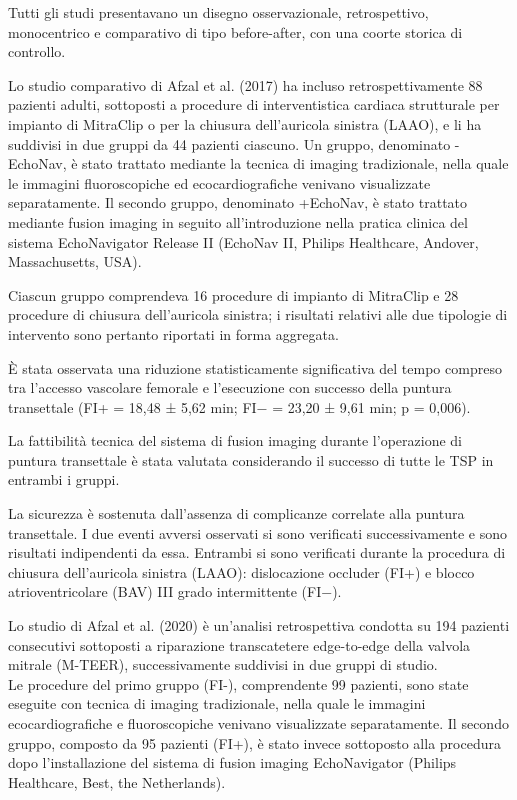 \documentclass[12pt,a4paper,twoside]{article}
\begin{document}
Tutti gli studi presentavano un disegno osservazionale, retrospettivo, monocentrico e comparativo di tipo before-after, con una coorte storica di controllo. \cite{ref24,ref25,ref26}

Lo studio comparativo di Afzal et al. (2017) ha incluso retrospettivamente 88 pazienti adulti, sottoposti a procedure di interventistica cardiaca strutturale per impianto di MitraClip o per la chiusura dell'auricola sinistra (LAAO), e li ha suddivisi in due gruppi da 44 pazienti ciascuno. Un gruppo, denominato -EchoNav, è stato trattato mediante la tecnica di imaging tradizionale, nella quale le immagini fluoroscopiche ed ecocardiografiche venivano visualizzate separatamente. Il secondo gruppo, denominato +EchoNav, è stato trattato mediante fusion imaging in seguito all'introduzione nella pratica clinica del sistema EchoNavigator Release II (EchoNav II, Philips Healthcare, Andover, Massachusetts, USA). \cite{ref24}

Ciascun gruppo comprendeva 16 procedure di impianto di MitraClip e 28 procedure di chiusura dell'auricola sinistra; i risultati relativi alle due tipologie di intervento sono pertanto riportati in forma aggregata. \cite{ref24}

È stata osservata una riduzione statisticamente significativa del tempo compreso tra l'accesso vascolare femorale e l'esecuzione con successo della puntura transettale (FI+ = 18,48 ± 5,62 min; FI− = 23,20 ± 9,61 min; p = 0,006). \cite{ref24}

La fattibilità tecnica del sistema di fusion imaging durante l'operazione di puntura transettale è stata valutata considerando il successo di tutte le TSP in entrambi i gruppi. \cite{ref24}

La sicurezza è sostenuta dall'assenza di complicanze correlate alla puntura transettale. I due eventi avversi osservati si sono verificati successivamente e sono risultati indipendenti da essa. Entrambi si sono verificati durante la procedura di chiusura dell'auricola sinistra (LAAO): dislocazione occluder (FI+) e blocco atrioventricolare (BAV) III grado intermittente (FI−). \cite{ref24}

Lo studio di Afzal et al. (2020) è un'analisi retrospettiva condotta su 194 pazienti consecutivi sottoposti a riparazione transcatetere edge-to-edge della valvola mitrale (M-TEER), successivamente suddivisi in due gruppi di studio.\\
Le procedure del primo gruppo (FI-), comprendente 99 pazienti, sono state eseguite con tecnica di imaging tradizionale, nella quale le immagini ecocardiografiche e fluoroscopiche venivano visualizzate separatamente. Il secondo gruppo, composto da 95 pazienti (FI+), è stato invece sottoposto alla procedura dopo l'installazione del sistema di fusion imaging EchoNavigator (Philips Healthcare, Best, the Netherlands). \cite{ref25}
\end{document}
